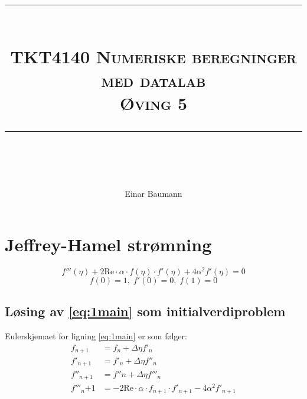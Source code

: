 



\usepackage{etex}
\usepackage{tikz,pgfplots}
\pgfplotsset{compat=1.9}
\usetikzlibrary{arrows,decorations.markings}


\author{Einar Baumann}
\title{
    \vspace{-1in}
    \vspace{0.1in}
    \rule{\textwidth}{0.5pt} \\[0.5cm]
    \normalfont \normalsize \textsc{TKT4140 Numeriske beregninger med datalab} \\ [20pt]
    {\textsc{ \huge Øving 5}} \\
    \vspace{0.1in}
    \rule{\textwidth}{2pt} \\[0.7cm]
}


\maketitle
\thispagestyle{empty}
\clearpage




\section{Jeffrey-Hamel strømning} %
\label{sec:jeffrey_hamel_str_mning}
\begin{equation}
  f'''(\eta) + 2 \mathrm{Re} \cdot \alpha \cdot f(\eta) \cdot f'(\eta) + 4 \alpha^2 f'(\eta) = 0
  \label{eq:1main}
\end{equation}
\begin{equation}
  f(0) = 1, \; f'(0) = 0, \; f(1) = 0 \tag{b}
\end{equation}

\subsection{Løsing av \eqref{eq:1main} som initialverdiproblem} %
\label{sub:l_sing_av_}
Eulerskjemaet for ligning \eqref{eq:1main} er som følger:
\begin{subequations}
  \begin{align}
    f_{n+1}    &= f_n   + \Delta \eta f'_n \\
    f'_{n+1}   &= f'_n  + \Delta \eta f''_n \\
    f''_{n+1}  &= f''n  + \Delta \eta f'''_n \\
    f'''_n{+1} &= - 2 \mathrm{Re} \cdot \alpha \cdot f_{n+1} \cdot f'_{n+1} - 4 \alpha^2 f'_{n+1}
  \end{align}
\end{subequations}

